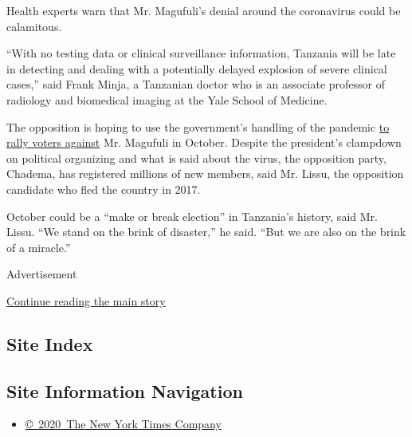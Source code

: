 Health experts warn that Mr. Magufuli's denial around the coronavirus
could be calamitous.

``With no testing data or clinical surveillance information, Tanzania
will be late in detecting and dealing with a potentially delayed
explosion of severe clinical cases,'' said Frank Minja, a Tanzanian
doctor who is an associate professor of radiology and biomedical imaging
at the Yale School of Medicine.

The opposition is hoping to use the government's handling of the
pandemic
\href{https://twitter.com/zittokabwe/status/1259467054014500864}{to
rally voters against} Mr. Magufuli in October. Despite the president's
clampdown on political organizing and what is said about the virus, the
opposition party, Chadema, has registered millions of new members, said
Mr. Lissu, the opposition candidate who fled the country in 2017.

October could be a ``make or break election'' in Tanzania's history,
said Mr. Lissu. ``We stand on the brink of disaster,'' he said. ``But we
are also on the brink of a miracle.''

Advertisement

\protect\hyperlink{after-bottom}{Continue reading the main story}

\hypertarget{site-index}{%
\subsection{Site Index}\label{site-index}}

\hypertarget{site-information-navigation}{%
\subsection{Site Information
Navigation}\label{site-information-navigation}}

\begin{itemize}
\tightlist
\item
  \href{https://help.nytimes3xbfgragh.onion/hc/en-us/articles/115014792127-Copyright-notice}{©~2020~The
  New York Times Company}
\end{itemize}

